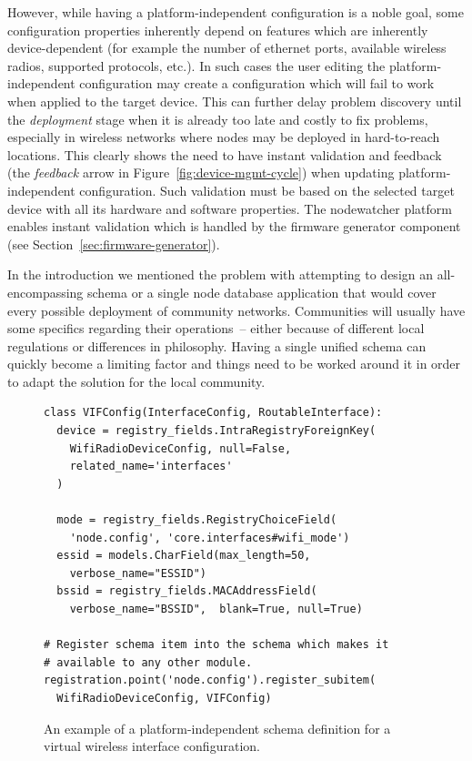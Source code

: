 \documentclass[5p,sort&compress]{elsarticle}
\begin{document}
However, while having a platform-independent configuration is a noble goal, some configuration properties inherently depend on features which are inherently device-dependent (for example the number of ethernet ports, available wireless radios, supported protocols, etc.).
In such cases the user editing the platform-independent configuration may create a configuration which will fail to work when applied to the target device.
This can further delay problem discovery until the \textit{deployment} stage when it is already too late and costly to fix problems, especially in wireless networks where nodes may be deployed in hard-to-reach locations.
This clearly shows the need to have instant validation and feedback (the \textit{feedback} arrow in Figure~\ref{fig:device-mgmt-cycle}) when updating platform-independent configuration.
Such validation must be based on the selected target device with all its hardware and software properties.
The nodewatcher platform enables instant validation which is handled by the firmware generator component (see Section~\ref{sec:firmware-generator}).

In the introduction we mentioned the problem with attempting to design an all-encompassing schema or a single node database application that would cover every possible deployment of community networks.
Communities will usually have some specifics regarding their operations~-- either because of different local regulations or differences in philosophy.
Having a single unified schema can quickly become a limiting factor and things need to be worked around it in order to adapt the solution for the local community.

\begin{figure}
\centering
\begin{verbatim}
class VIFConfig(InterfaceConfig, RoutableInterface):
  device = registry_fields.IntraRegistryForeignKey(
    WifiRadioDeviceConfig, null=False,
    related_name='interfaces'
  )

  mode = registry_fields.RegistryChoiceField(
    'node.config', 'core.interfaces#wifi_mode')
  essid = models.CharField(max_length=50,
    verbose_name="ESSID")
  bssid = registry_fields.MACAddressField(
    verbose_name="BSSID",  blank=True, null=True)

# Register schema item into the schema which makes it
# available to any other module.
registration.point('node.config').register_subitem(
  WifiRadioDeviceConfig, VIFConfig)
\end{verbatim}
\caption{An example of a platform-independent schema definition for a virtual wireless interface configuration.}
\label{fig:schema-module-wifi}
\end{figure}
\end{document}
